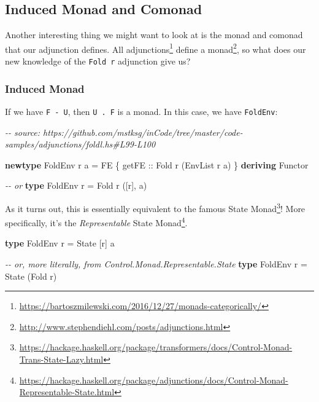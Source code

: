 \documentclass[]{article}
\newenvironment{Shaded}{}{}
\newcommand{\CommentTok}[1]{\textcolor[rgb]{0.38,0.63,0.69}{\textit{#1}}}
\newcommand{\DataTypeTok}[1]{\textcolor[rgb]{0.56,0.13,0.00}{#1}}
\newcommand{\KeywordTok}[1]{\textcolor[rgb]{0.00,0.44,0.13}{\textbf{#1}}}
\newcommand{\NormalTok}[1]{#1}
\newcommand{\OtherTok}[1]{\textcolor[rgb]{0.00,0.44,0.13}{#1}}
\renewcommand{\href}[2]{#2\footnote{\url{#1}}}
\begin{document}
\hypertarget{induced-monad-and-comonad}{%
\subsection{Induced Monad and Comonad}\label{induced-monad-and-comonad}}

Another interesting thing we might want to look at is the monad and comonad that
our adjunction defines.
\href{https://bartoszmilewski.com/2016/12/27/monads-categorically/}{All
adjunctions} \href{http://www.stephendiehl.com/posts/adjunctions.html}{define a
monad}, so what does our new knowledge of the \texttt{Fold\ r} adjunction give
us?

\hypertarget{induced-monad}{%
\subsubsection{Induced Monad}\label{induced-monad}}

If we have \texttt{F\ -\textbar{}\ U}, then \texttt{U\ .\ F} is a monad. In this
case, we have \texttt{FoldEnv}:

\begin{Shaded}
\begin{Highlighting}[]
\CommentTok{{-}{-} source: https://github.com/mstksg/inCode/tree/master/code{-}samples/adjunctions/foldl.hs\#L99{-}L100}

\KeywordTok{newtype} \DataTypeTok{FoldEnv}\NormalTok{ r a }\OtherTok{=} \DataTypeTok{FE}\NormalTok{ \{}\OtherTok{ getFE ::} \DataTypeTok{Fold}\NormalTok{ r (}\DataTypeTok{EnvList}\NormalTok{ r a) \}}
  \KeywordTok{deriving} \DataTypeTok{Functor}

\CommentTok{{-}{-} or}
\KeywordTok{type} \DataTypeTok{FoldEnv}\NormalTok{ r }\OtherTok{=} \DataTypeTok{Fold}\NormalTok{ r ([r], a)}
\end{Highlighting}
\end{Shaded}

As it turns out, this is essentially equivalent to the famous
\href{https://hackage.haskell.org/package/transformers/docs/Control-Monad-Trans-State-Lazy.html}{State
Monad}! More specifically, it's the
\href{https://hackage.haskell.org/package/adjunctions/docs/Control-Monad-Representable-State.html}{\emph{Representable}
State Monad}.

\begin{Shaded}
\begin{Highlighting}[]
\KeywordTok{type} \DataTypeTok{FoldEnv}\NormalTok{ r }\OtherTok{=} \DataTypeTok{State}\NormalTok{ [r] a}

\CommentTok{{-}{-} or, more literally, from Control.Monad.Representable.State}
\KeywordTok{type} \DataTypeTok{FoldEnv}\NormalTok{ r }\OtherTok{=} \DataTypeTok{State}\NormalTok{ (}\DataTypeTok{Fold}\NormalTok{ r)}
\end{Highlighting}
\end{Shaded}
\end{document}
